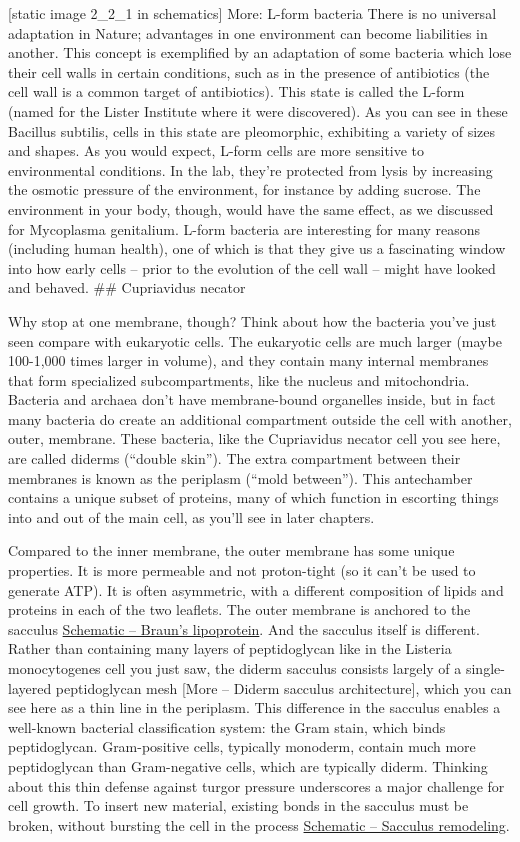 \documentclass[]{book}
\begin{document}
{[}static image 2\_2\_1 in schematics{]} More: L-form bacteria There is
no universal adaptation in Nature; advantages in one environment can
become liabilities in another. This concept is exemplified by an
adaptation of some bacteria which lose their cell walls in certain
conditions, such as in the presence of antibiotics (the cell wall is a
common target of antibiotics). This state is called the L-form (named
for the Lister Institute where it were discovered). As you can see in
these Bacillus subtilis, cells in this state are pleomorphic, exhibiting
a variety of sizes and shapes. As you would expect, L-form cells are
more sensitive to environmental conditions. In the lab, they're
protected from lysis by increasing the osmotic pressure of the
environment, for instance by adding sucrose. The environment in your
body, though, would have the same effect, as we discussed for Mycoplasma
genitalium. L-form bacteria are interesting for many reasons (including
human health), one of which is that they give us a fascinating window
into how early cells -- prior to the evolution of the cell wall -- might
have looked and behaved. \#\# Cupriavidus necator

Why stop at one membrane, though? Think about how the bacteria you've
just seen compare with eukaryotic cells. The eukaryotic cells are much
larger (maybe 100-1,000 times larger in volume), and they contain many
internal membranes that form specialized subcompartments, like the
nucleus and mitochondria. Bacteria and archaea don't have membrane-bound
organelles inside, but in fact many bacteria do create an additional
compartment outside the cell with another, outer, membrane. These
bacteria, like the Cupriavidus necator cell you see here, are called
diderms (``double skin''). The extra compartment between their membranes
is known as the periplasm (``mold between''). This antechamber contains
a unique subset of proteins, many of which function in escorting things
into and out of the main cell, as you'll see in later chapters.

Compared to the inner membrane, the outer membrane has some unique
properties. It is more permeable and not proton-tight (so it can't be
used to generate ATP). It is often asymmetric, with a different
composition of lipids and proteins in each of the two leaflets. The
outer membrane is anchored to the sacculus
\protect\hyperlink{fig:2-3-1}{Schematic -- Braun's lipoprotein}. And the
sacculus itself is different. Rather than containing many layers of
peptidoglycan like in the Listeria monocytogenes cell you just saw, the
diderm sacculus consists largely of a single-layered peptidoglycan mesh
{[}More -- Diderm sacculus architecture{]}, which you can see here as a
thin line in the periplasm. This difference in the sacculus enables a
well-known bacterial classification system: the Gram stain, which binds
peptidoglycan. Gram-positive cells, typically monoderm, contain much
more peptidoglycan than Gram-negative cells, which are typically diderm.
Thinking about this thin defense against turgor pressure underscores a
major challenge for cell growth. To insert new material, existing bonds
in the sacculus must be broken, without bursting the cell in the process
\protect\hyperlink{fig:2-3-2}{Schematic -- Sacculus remodeling}.
\end{document}
